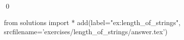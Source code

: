 
\begin{ex} 
  \label{ex:length_of_strings}
  
  \qed
\end{ex} 
\begin{python0}
from solutions import *
add(label="ex:length_of_strings",
    srcfilename='exercises/length_of_strings/answer.tex') 
\end{python0}
